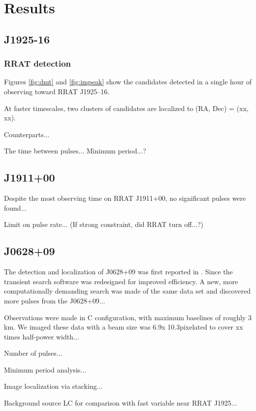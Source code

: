 \section{Results}\begin{quote}

\end{quote}

\subsection{J1925-16}
\subsubsection{RRAT detection}
\label{rrat1925}

Figures \ref{fig:dmt} and \ref{fig:impeak} show the candidates detected in a single hour of observing toward RRAT J1925--16. 

At faster timescales, two clusters of candidates are localized to (RA, Dec) = (xx, xx). 

Counterparts...

The time between pulses... Minimum period...?

\subsection{J1911+00}

Despite the most observing time on RRAT J1911+00, no significant pulses were found...

Limit on pulse rate...
(If strong constraint, did RRAT turn off...?)

\subsection{J0628+09}

The detection and localization of J0628+09 was first reported in \cite{Law_2012}. Since the transient search software was redesigned for improved efficiency. A new, more computationally demanding search was made of the same data set and discovered more pulses from the J0628+09...

Observations were made in C configuration, with maximum baselines of roughly 3 km. We imaged these data with a beam size was 6.9\arcsec x 10.3\arcsec pixelated to cover xx times half-power width...

Number of pulses...

Minimum period analysis...

Image localization via stacking...

Background source LC for comparison with fast variable near RRAT J1925...
  
  